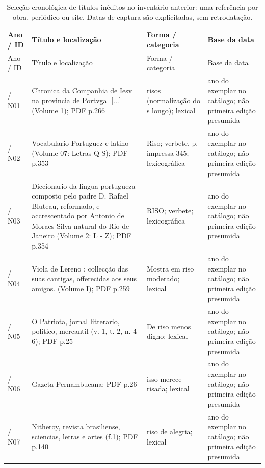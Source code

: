 \small\begin{longtable}{>{\raggedright\arraybackslash}p{}>{\raggedright\arraybackslash}p{}>{\raggedright\arraybackslash}p{}>{\raggedright\arraybackslash}p{}}
\caption{Seleção cronológica de títulos inéditos no inventário anterior: uma referência por obra, periódico ou site. Datas de captura são explicitadas, sem retrodatação.}\\
\toprule Ano / ID & Título e localização & Forma / categoria & Base da data \\\midrule\endfirsthead
\toprule Ano / ID & Título e localização & Forma / categoria & Base da data \\\midrule\endhead
1645 / N01 & Chronica da Companhia de Iesv na provincia de Portvgal [...] (Volume 1); PDF p.266 \cite{r4chronicacompanhiaiesvportugal} & risos (normalização do s longo); lexical & ano do exemplar no catálogo; não primeira edição presumida\\
1720 / N02 & Vocabulario Portuguez e latino (Volume 07: Letras Q-S); PDF p.353 \cite{r4vocabularioportuguezlatino} & Riso; verbete, p. impressa 345; lexicográfica & ano do exemplar no catálogo; não primeira edição presumida\\
1789 / N03 & Diccionario da lingua portugueza composto pelo padre D. Rafael Bluteau, reformado, e accrescentado por Antonio de Moraes Silva natural do Rio de Janeiro (Volume 2: L - Z); PDF p.354 \cite{r4diccionariolinguaportuguezamorais} & RISO; verbete; lexicográfica & ano do exemplar no catálogo; não primeira edição presumida\\
1798 / N04 & Viola de Lereno : collecção das suas cantigas, offerecidas aos seus amigos. (Volume I); PDF p.259 \cite{r4violadelereno} & Mostra em riso moderado; lexical & ano do exemplar no catálogo; não primeira edição presumida\\
1813 / N05 & O Patriota, jornal litterario, político, mercantil (v. 1, t. 2, n. 4-6); PDF p.25 \cite{r4opatriota} & De riso menos digno; lexical & ano do exemplar no catálogo; não primeira edição presumida\\
1822 / N06 & Gazeta Pernambucana; PDF p.26 \cite{r4gazetapernambucana} & isso merece risada; lexical & ano do exemplar no catálogo; não primeira edição presumida\\
1836 / N07 & Nitheroy, revista brasiliense, sciencias, letras e artes (f.1); PDF p.140 \cite{r4nitheroy} & riso de alegria; lexical & ano do exemplar no catálogo; não primeira edição presumida\\

\end{longtable}
